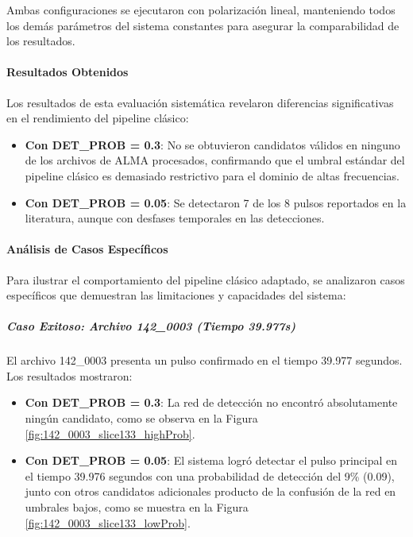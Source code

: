 Ambas configuraciones se ejecutaron con polarización lineal, manteniendo todos los demás parámetros del sistema constantes para asegurar la comparabilidad de los resultados.

\paragraph{Resultados Obtenidos}

Los resultados de esta evaluación sistemática revelaron diferencias significativas en el rendimiento del pipeline clásico:

\begin{itemize}
    \item \textbf{Con DET\_PROB = 0.3}: No se obtuvieron candidatos válidos en ninguno de los archivos de ALMA procesados, confirmando que el umbral estándar del pipeline clásico es demasiado restrictivo para el dominio de altas frecuencias.
    \item \textbf{Con DET\_PROB = 0.05}: Se detectaron 7 de los 8 pulsos reportados en la literatura, aunque con desfases temporales en las detecciones.
\end{itemize}

\paragraph{Análisis de Casos Específicos}

Para ilustrar el comportamiento del pipeline clásico adaptado, se analizaron casos específicos que demuestran las limitaciones y capacidades del sistema:

\subparagraph{Caso Exitoso: Archivo 142\_0003 (Tiempo 39.977s)}

El archivo 142\_0003 presenta un pulso confirmado en el tiempo 39.977 segundos. Los resultados mostraron:

\begin{itemize}
    \item \textbf{Con DET\_PROB = 0.3}: La red de detección no encontró absolutamente ningún candidato, como se observa en la Figura \ref{fig:142_0003_slice133_highProb}.
    \item \textbf{Con DET\_PROB = 0.05}: El sistema logró detectar el pulso principal en el tiempo 39.976 segundos con una probabilidad de detección del 9\% (0.09), junto con otros candidatos adicionales producto de la confusión de la red en umbrales bajos, como se muestra en la Figura \ref{fig:142_0003_slice133_lowProb}.
\end{itemize}

